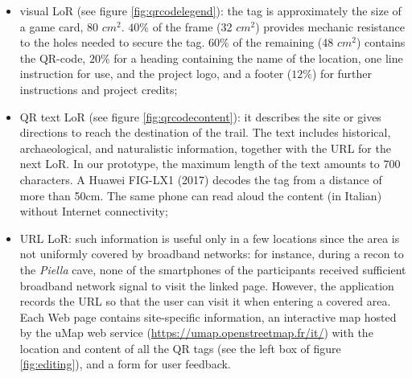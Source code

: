 \documentclass[sustainability,article,submit,pdftex,moreauthors]{Definitions/mdpi}
\begin{document}
\begin{itemize}
    \item visual LoR (see figure \ref{fig:qrcodelegend}): the tag is approximately the size of a game card, 80 $cm^2$. $40\%$ of the frame (32 $cm^2$) provides mechanic resistance to the holes needed to secure the tag. $60\%$ of the remaining (48 $cm^2$) contains the QR-code, $20\%$ for a heading containing the name of the location, one line instruction for use, and the project logo, and a footer ($12\%$) for further instructions and project credits;
    
    \item QR text LoR (see figure \ref{fig:qrcodecontent}): it describes the site or gives directions to reach the destination of the trail. The text includes historical, archaeological, and naturalistic information, together with the URL for the next LoR. In our prototype, the maximum length of the text amounts to 700 characters. A Huawei FIG-LX1 (2017) decodes the tag from a distance of more than 50cm. The same phone can read aloud the content (in Italian) without Internet connectivity;

    \item URL LoR: such information is useful only in a few locations since the area is not uniformly covered by broadband networks: for instance, during a recon to the {\em Piella} cave, none of the smartphones of the participants received sufficient broadband network signal to visit the linked page. However, the application records the URL so that the user can visit it when entering a covered area. Each Web page contains site-specific information, an interactive map hosted by the uMap web service (\url{https://umap.openstreetmap.fr/it/}) with the location and content of all the QR tags (see the left box of figure \ref{fig:editing}), and a form for user feedback.
\end{itemize}
\end{document}
